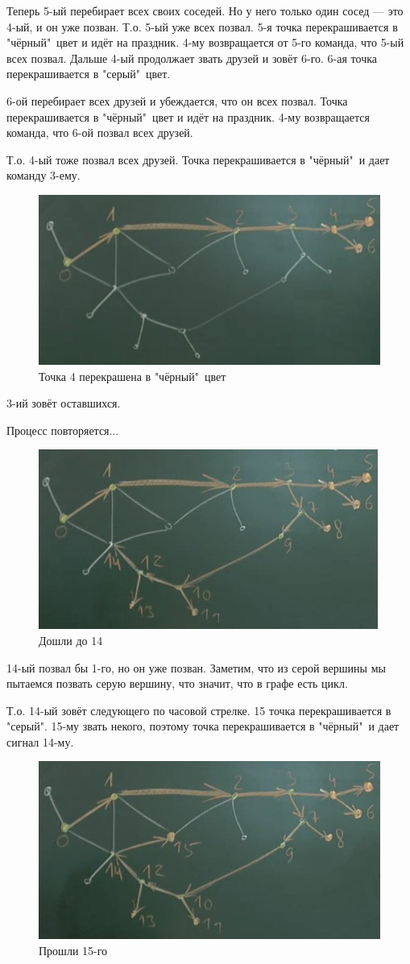 Теперь 5-ый перебирает всех своих соседей. Но у него только один сосед --- это 4-ый, и он уже позван. Т.о. 5-ый уже всех позвал. 5-я точка перекрашивается в "чёрный"\ цвет и идёт на праздник. 4-му возвращается от 5-го команда, что 5-ый всех позвал. Дальше 4-ый продолжает звать друзей и зовёт 6-го. 6-ая точка перекрашивается в "серый"\ цвет.

6-ой перебирает всех друзей и убеждается, что он всех позвал. Точка перекрашивается в "чёрный"\ цвет и идёт на праздник. 4-му возвращается команда, что 6-ой позвал всех друзей.

Т.о. 4-ый тоже позвал всех друзей. Точка перекрашивается в "чёрный"\ и дает команду 3-ему.

\begin{figure}[h!]
	\centering
	\includegraphics[width=0.5\linewidth]{lection_18/alg5}
	\caption{Точка 4 перекрашена в "чёрный"\ цвет}
\end{figure}

3-ий зовёт оставшихся.

Процесс повторяется...
\vspace{10cm}
\begin{figure}[h!]
	\centering
	\includegraphics[width=0.5\linewidth]{lection_18/alg6}
	\caption{Дошли до 14}
\end{figure}

14-ый позвал бы 1-го, но он уже позван. Заметим, что из серой вершины мы пытаемся позвать серую вершину, что значит, что в графе есть цикл.

Т.о. 14-ый зовёт следующего по часовой стрелке. 15 точка перекрашивается в "серый". 15-му звать некого, поэтому точка перекрашивается в "чёрный"\ и дает сигнал 14-му.

\begin{figure}[h!]
	\centering
	\includegraphics[width=0.5\linewidth]{lection_18/alg7}
	\caption{Прошли 15-го}
\end{figure}

